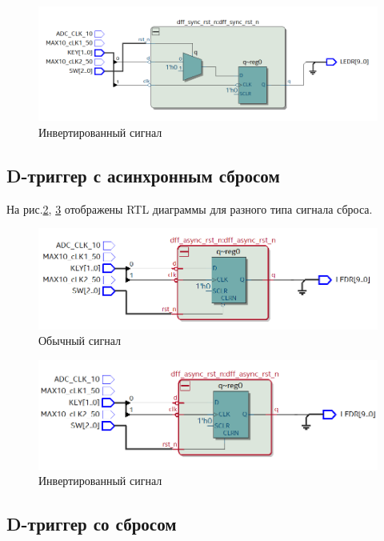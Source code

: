 \documentclass[a4paper,14pt]{article}
\begin{document}
\begin{figure}[H]
	\centering
	\includegraphics[width=0.9\linewidth]{imgs/7_RTL_neinv}
	\caption{Инвертированный сигнал}
	\label{fig:7_RTL_neinv}
\end{figure}

\subsection{D-триггер с асинхронным сбросом}


На рис.\ref{fig:8_RTL_sample}, \ref{fig:8_RTL_neinv} отображены RTL диаграммы для разного типа сигнала сброса. 

\begin{figure}[H]
	\centering
	\includegraphics[width=0.9\linewidth]{imgs/8_RTL_sample}
	\caption{Обычный сигнал}
	\label{fig:8_RTL_sample}
\end{figure}

\begin{figure}[H]
	\centering
	\includegraphics[width=0.9\linewidth]{imgs/8_RTL_neinv}
	\caption{Инвертированный сигнал}
	\label{fig:8_RTL_neinv}
\end{figure}

\subsection{D-триггер со сбросом}
\end{document}
